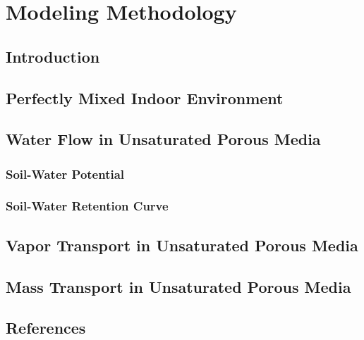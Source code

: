 \documentclass[../thesis.tex]{subfiles}
\begin{document}
\chapter{Modeling Methodology}

\section{Introduction}


\section{Perfectly Mixed Indoor Environment}


\section{Water Flow in Unsaturated Porous Media}

\subsection{Soil-Water Potential}

\subsection{Soil-Water Retention Curve}


\section{Vapor Transport in Unsaturated Porous Media}


\section{Mass Transport in Unsaturated Porous Media}




\section{References}

\end{document}
